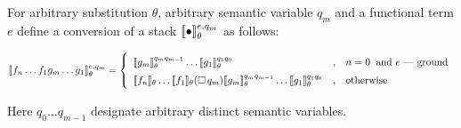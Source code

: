 \begin{definition}
\normalfont For arbitrary substitution $\theta$, arbitrary semantic variable $q_m$ and a functional 
term $e$ define a conversion of a stack $\llbracket{\bullet}\rrbracket^{e,q_m}_\theta$ as follows:

$$
\def\arraystretch{1.5}
\sembr{f_n\dots f_1g_m\dots g_1}^{e,q_m}_\theta=\left\{
\begin{array}{lcl}
\sembr{g_m}^{q_mq_{m-1}}_\theta\dots\sembr{g_1}^{q_1q_0}_\theta&,&n=0\;\;\mbox{and $e$~--- ground}\\
\sembr{f_n}_\theta\dots\sembr{f_1}_\theta(\Box\,q_m)\sembr{g_m}^{q_mq_{m-1}}_\theta\dots\sembr{g_1}^{q_1q_0}_\theta&,&\mbox{otherwise}
\end{array}
\right.
$$

Here $q_0\dots q_{m-1}$ designate arbitrary distinct semantic variables.
\end{definition}

